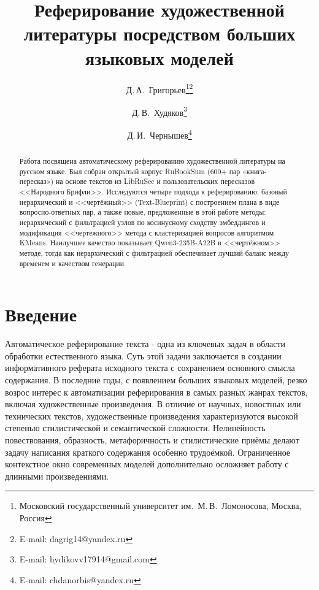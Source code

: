 \documentclass{superfri}
\begin{document}
\author{Д.\,А.~Григорьев\footnote{\label{msu}Московский государственный университет им.~М.\,В.~Ломоносова, Москва, Россия}\footnote{E-mail: dagrig14@yandex.ru} \and Д.\,В.~Худяков\footnote{E-mail: hydikovv17914@gmail.com} \and Д.\,И.~Чернышев\footnote{E-mail: chdanorbis@yandex.ru}}

\title{Реферирование художественной литературы посредством больших языковых моделей}

\maketitle{}

\begin{abstract}
Работа посвящена автоматическому реферированию художественной литературы на русском языке.
Был собран открытый корпус RuBookSum (600+ пар «книга-пересказ») на основе текстов из LibRuSec и пользовательских пересказов <<Народного Брифли>>.
Исследуются четыре подхода к реферированию: базовый иерархический и <<чертёжный>> (Text-Blueprint) с построением плана в виде вопросно-ответных пар, 
а также новые, предложенные в этой работе методы: иерархический с фильтрацией узлов по косинусному сходству эмбеддингов и модификация <<чертежного>> 
метода с кластеризацией вопросов алгоритмом KMeans.
Наилучшее качество показывает Qwen3-235B-A22B в <<чертёжном>> методе, тогда как иерархический с фильтрацией обеспечивает лучший баланс между
временем и качеством генерации.


\end{abstract}



\section*{Введение}
Автоматическое реферирование текста - одна из ключевых задач в области обработки естественного языка. Суть этой задачи заключается в создании информативного реферата исходного текста с сохранением основного смысла содержания. 
В последние годы, с появлением больших языковых моделей, резко возрос интерес к автоматизации реферирования в самых разных жанрах текстов, включая художественные произведения. 
В отличие от научных, новостных или технических текстов, художественные произведения характеризуются высокой степенью стилистической и семантической сложности. 
Нелинейность повествования, образность, метафоричность и стилистические приёмы делают задачу написания краткого содержания особенно трудоёмкой. 
Ограниченное контекстное окно современных моделей дополнительно осложняет работу с длинными произведениями.
\end{document}
